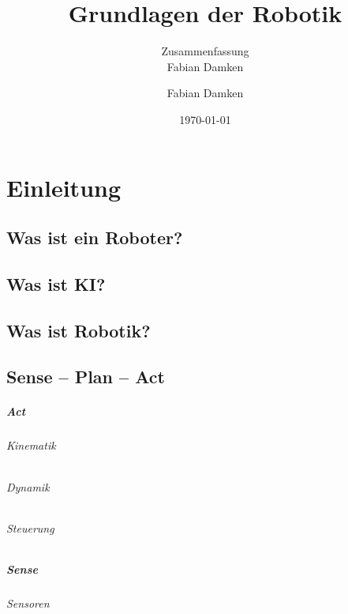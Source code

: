 \documentclass[a4paper, 11pt, accentcolor = tud3b]{tudreport}
\title{Grundlagen der Robotik}
\subtitle{Zusammenfassung \\ Fabian Damken}
\author{Fabian Damken}
\date{\today}
\begin{document}
	\maketitle
	\tableofcontents
	\listoftodos

	\chapter{Einleitung} %
		
		\section{Was ist ein Roboter?} %

		\section{Was ist KI?} %

		\section{Was ist Robotik?} %

		\section{Sense -- Plan -- Act} %

			\paragraph{Act} %

				\subparagraph{Kinematik} %

				\subparagraph{Dynamik} %

				\subparagraph{Steuerung} %

			\paragraph{Sense} %

				\subparagraph{Sensoren} %
\end{document}
